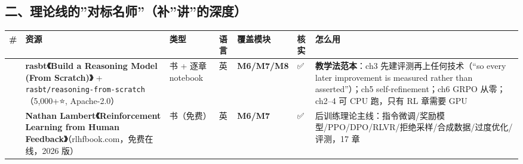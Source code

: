 \documentclass[
  chinese,
  11pt,
]{ctexart}
\newcounter{none} %
\begin{document}
\subsection{二、理论线的''对标名师''（补''讲''的深度）}\label{ux4e8cux7406ux8bbaux7ebfux7684ux5bf9ux6807ux540dux5e08ux8865ux8bb2ux7684ux6df1ux5ea6}

{\def\LTcaptype{none} %
\begin{longtable}[]{@{}
  >{\raggedright\arraybackslash}p{}
  >{\raggedright\arraybackslash}p{}
  >{\raggedright\arraybackslash}p{}
  >{\raggedright\arraybackslash}p{}
  >{\raggedright\arraybackslash}p{}
  >{\raggedright\arraybackslash}p{}
  >{\raggedright\arraybackslash}p{}@{}}
\toprule\noalign{}
\begin{minipage}[b]{\linewidth}\raggedright
\#
\end{minipage} & \begin{minipage}[b]{\linewidth}\raggedright
资源
\end{minipage} & \begin{minipage}[b]{\linewidth}\raggedright
类型
\end{minipage} & \begin{minipage}[b]{\linewidth}\raggedright
语言
\end{minipage} & \begin{minipage}[b]{\linewidth}\raggedright
覆盖模块
\end{minipage} & \begin{minipage}[b]{\linewidth}\raggedright
核实
\end{minipage} & \begin{minipage}[b]{\linewidth}\raggedright
怎么用
\end{minipage} \\
\midrule\noalign{}
\endhead
\bottomrule\noalign{}
\endlastfoot
4 & \textbf{rasbt《Build a Reasoning Model (From Scratch)》} + \texttt{rasbt/reasoning-from-scratch}（5,000+⭐, Apache-2.0） & 书 + 逐章 notebook & 英 & \textbf{M6/M7/M8} & ✅ & \textbf{教学法范本}：ch3 先建评测再上任何技术（``so every later improvement is measured rather than asserted''）；ch5 self-refinement；ch6 GRPO 从零；ch2--4 可 CPU 跑，只有 RL 章需要 GPU \\
5 & \textbf{Nathan Lambert《Reinforcement Learning from Human Feedback》}（rlhfbook.com，免费在线，2026 版） & 书（免费） & 英 & \textbf{M6/M7} & ✅ & 后训练理论主线：指令微调/奖励模型/PPO/DPO/RLVR/拒绝采样/合成数据/过度优化/评测，17 章 \\

\end{longtable}}
\end{document}
